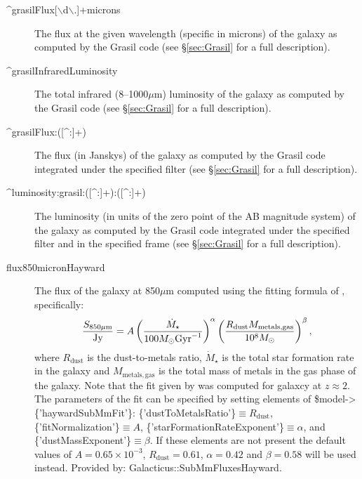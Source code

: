 \begin{description}
 \item[{\normalfont \ttfamily \textasciicircum grasilFlux[$\backslash$d$\backslash$.]+microns}] The flux at the given wavelength (specific in microns) of the galaxy as computed by the {\normalfont \ttfamily Grasil} code (see \S\ref{sec:Grasil} for a full description).
 \item[{\normalfont \ttfamily \textasciicircum grasilInfraredLuminosity}] The total infrared (8--1000$\mu$m) luminosity of the galaxy as computed by the {\normalfont \ttfamily Grasil} code (see \S\ref{sec:Grasil} for a full description).
 \item[{\normalfont \ttfamily \textasciicircum grasilFlux:([\textasciicircum :]+)}] The flux (in Janskys) of the galaxy as computed by the {\normalfont \ttfamily Grasil} code integrated under the specified filter (see \S\ref{sec:Grasil} for a full description).
 \item[{\normalfont \ttfamily \textasciicircum luminosity:grasil:([\textasciicircum :]+):([\textasciicircum :]+)}] The luminosity (in units of the zero point of the AB magnitude system) of the galaxy as computed by the {\normalfont \ttfamily Grasil} code integrated under the specified filter and in the specified frame (see \S\ref{sec:Grasil} for a full description).
 \item[{\normalfont \ttfamily flux850micronHayward}] The flux of the galaxy at 850$\mu$m computed using the fitting formula of \cite{hayward_what_2010}, specifically:
\begin{equation}
 {S_{850\mu\mathrm{m}} \over \mathrm{Jy}} = A \left({\dot{M}_\star \over 100 M_\odot \hbox{Gyr}^{-1}}\right)^\alpha \left({R_\mathrm{dust} M_\mathrm{metals,gas} \over 10^8 M_\odot}\right)^\beta,
\end{equation}
where $R_\mathrm{dust}$ is the dust-to-metals ratio, $\dot{M}_\star$ is the total star formation rate in the galaxy and $M_\mathrm{metals,gas}$ is the total mass of metals in the gas phase of the galaxy. Note that the fit given by \cite{hayward_what_2010} was computed for galaxcy at $z\approx 2$. The parameters of the fit can be specified by setting elements of {\normalfont \ttfamily \$model-\textgreater\{'haywardSubMmFit'\}}: {\normalfont \ttfamily \{'dustToMetalsRatio'\}}$\equiv R_\mathrm{dust}$, {\normalfont \ttfamily \{'fitNormalization'\}}$\equiv A$, {\normalfont \ttfamily \{'starFormationRateExponent'\}}$\equiv \alpha$, and {\normalfont \ttfamily \{'dustMassExponent'\}}$\equiv \beta$. If these elements are not present the default values of $A=0.65\times 10^{-3}$, $R_\mathrm{dust}=0.61$, $\alpha=0.42$ and $\beta = 0.58$ \cite{hayward_what_2010} will be used instead. Provided by: {\normalfont \ttfamily Galacticus::SubMmFluxesHayward}.

\end{description}
